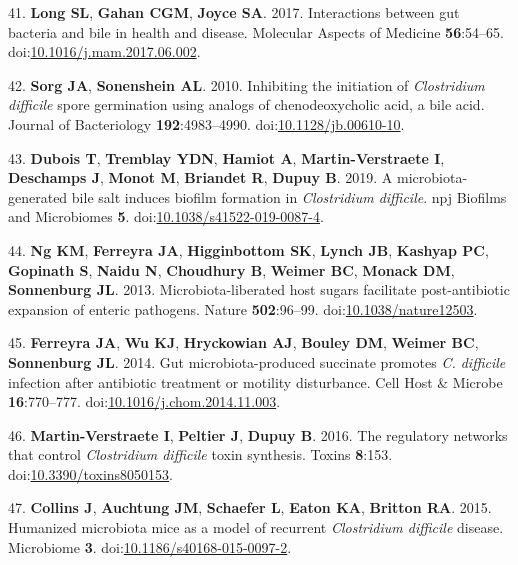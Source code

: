 \documentclass[
  12pt,
]{article}
\newenvironment{cslreferences}%
  {}%
  {\par}
\begin{document}
\begin{cslreferences}
\leavevmode\hypertarget{ref-Long2017}{}%
41. \textbf{Long SL}, \textbf{Gahan CGM}, \textbf{Joyce SA}. 2017.
Interactions between gut bacteria and bile in health and disease.
Molecular Aspects of Medicine \textbf{56}:54--65.
doi:\href{https://doi.org/10.1016/j.mam.2017.06.002}{10.1016/j.mam.2017.06.002}.

\leavevmode\hypertarget{ref-Sorg2010}{}%
42. \textbf{Sorg JA}, \textbf{Sonenshein AL}. 2010. Inhibiting the
initiation of \emph{Clostridium difficile} spore germination using
analogs of chenodeoxycholic acid, a bile acid. Journal of Bacteriology
\textbf{192}:4983--4990.
doi:\href{https://doi.org/10.1128/jb.00610-10}{10.1128/jb.00610-10}.

\leavevmode\hypertarget{ref-Dubois2019}{}%
43. \textbf{Dubois T}, \textbf{Tremblay YDN}, \textbf{Hamiot A},
\textbf{Martin-Verstraete I}, \textbf{Deschamps J}, \textbf{Monot M},
\textbf{Briandet R}, \textbf{Dupuy B}. 2019. A microbiota-generated bile
salt induces biofilm formation in \emph{Clostridium difficile}. npj
Biofilms and Microbiomes \textbf{5}.
doi:\href{https://doi.org/10.1038/s41522-019-0087-4}{10.1038/s41522-019-0087-4}.

\leavevmode\hypertarget{ref-Ng2013}{}%
44. \textbf{Ng KM}, \textbf{Ferreyra JA}, \textbf{Higginbottom SK},
\textbf{Lynch JB}, \textbf{Kashyap PC}, \textbf{Gopinath S},
\textbf{Naidu N}, \textbf{Choudhury B}, \textbf{Weimer BC},
\textbf{Monack DM}, \textbf{Sonnenburg JL}. 2013. Microbiota-liberated
host sugars facilitate post-antibiotic expansion of enteric pathogens.
Nature \textbf{502}:96--99.
doi:\href{https://doi.org/10.1038/nature12503}{10.1038/nature12503}.

\leavevmode\hypertarget{ref-Ferreyra2014}{}%
45. \textbf{Ferreyra JA}, \textbf{Wu KJ}, \textbf{Hryckowian AJ},
\textbf{Bouley DM}, \textbf{Weimer BC}, \textbf{Sonnenburg JL}. 2014.
Gut microbiota-produced succinate promotes \emph{C. difficile} infection
after antibiotic treatment or motility disturbance. Cell Host \& Microbe
\textbf{16}:770--777.
doi:\href{https://doi.org/10.1016/j.chom.2014.11.003}{10.1016/j.chom.2014.11.003}.

\leavevmode\hypertarget{ref-MartinVerstraete2016}{}%
46. \textbf{Martin-Verstraete I}, \textbf{Peltier J}, \textbf{Dupuy B}.
2016. The regulatory networks that control \emph{Clostridium difficile}
toxin synthesis. Toxins \textbf{8}:153.
doi:\href{https://doi.org/10.3390/toxins8050153}{10.3390/toxins8050153}.

\leavevmode\hypertarget{ref-Collins2015}{}%
47. \textbf{Collins J}, \textbf{Auchtung JM}, \textbf{Schaefer L},
\textbf{Eaton KA}, \textbf{Britton RA}. 2015. Humanized microbiota mice
as a model of recurrent \emph{Clostridium difficile} disease. Microbiome
\textbf{3}.
doi:\href{https://doi.org/10.1186/s40168-015-0097-2}{10.1186/s40168-015-0097-2}.


\end{cslreferences}
\end{document}

